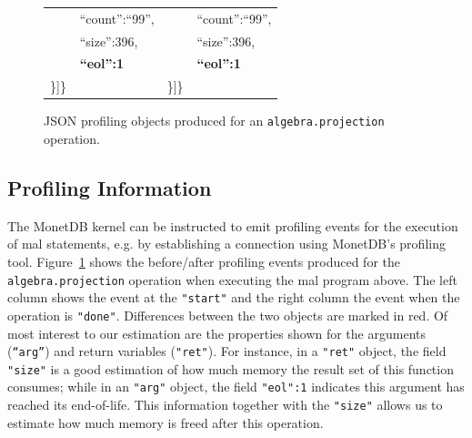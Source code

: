 \documentclass[conference]{IEEEtran}
\begin{document}
\begin{figure}[t]
{\begin{tabular}{|l@{~}l|}
 ~~~~   ``count'':``99'',                                 &   ~~~~    ``count'':``99'',                                  \\
 ~~~~   ``size'':396,                                     &   ~~~~    ``size'':396,                                      \\
 ~~~~   \textbf{``eol'':1}                                &   ~~~~    \textbf{``eol'':1}                                 \\
   \}]\}                                                  &      \}]\}                                                   \\
\hline
\end{tabular}
}
\caption{JSON profiling objects produced for an \texttt{\small algebra.projection} operation.}
\label{fig:json_obj}
\end{figure}

\subsection{Profiling Information}

The MonetDB kernel can be instructed to emit profiling events for the execution of {\sc mal} statements, e.g. by establishing a connection using MonetDB’s profiling tool.
Figure~\ref{fig:json_obj} shows the before/after profiling events produced for the \texttt{\small algebra.projection} operation when executing the {\sc mal} program above.
The left column shows the event at the \texttt{\small "start"} and the right column the event when the operation is \texttt{\small "done"}.
Differences between the two objects are marked in red.
Of most interest to our estimation are the properties shown for the arguments  (\texttt{\small “arg”}) and return variables (\texttt{\small "ret"}).
For instance, in a \texttt{\small "ret"} object, the field \texttt{\small "size"} is a good estimation of how much memory the result set of this function consumes; while in an \texttt{\small "arg"} object, the field \texttt{\small "eol":1} indicates this argument has reached its end-of-life.
This information together with the \texttt{\small "size"} allows us to estimate how much memory is freed after this operation.
\end{document}
